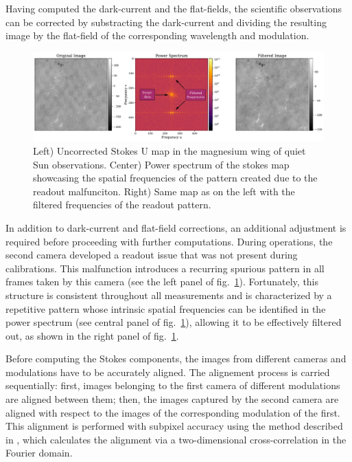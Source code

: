 Having computed the dark-current and the flat-fields, the scientific observations can be corrected by substracting the dark-current and dividing the resulting image by the flat-field of the corresponding wavelength and modulation. 

\begin{figure}
  \includegraphics[width=\textwidth]{figures/Pipeline/readout_problem.pdf}
  \caption[Readout pattern filtering]{Left) Uncorrected Stokes U map in the magnesium wing of quiet Sun observations. Center) Power spectrum of the stokes map showcasing the spatial frequencies of the pattern created due to the readout malfunciton. Right) Same map as on the left with the filtered frequencies of the readout pattern.}
    \label{fig_pipeline: readout}
\end{figure}

In addition to dark-current and flat-field corrections, an additional adjustment is required before proceeding with further computations. During operations, the second camera developed a readout issue that was not present during calibrations. This malfunction introduces a recurring spurious pattern in all frames taken by this camera (see the left panel of fig.~\ref{fig_pipeline: readout}). Fortunately, this structure is consistent throughout all measurements and is characterized by a repetitive pattern whose intrinsic spatial frequencies can be identified in the power spectrum (see central panel of fig.~\ref{fig_pipeline: readout}), allowing it to be effectively filtered out, as shown in the right panel of fig.~\ref{fig_pipeline: readout}.  

Before computing the Stokes components, the images from different cameras and modulations have to be accurately aligned. The alignement process is carried sequentially: first, images belonging to the first camera of different modulations are aligned between them; then, the images captured by the second camera are aligned with respect to the images of the corresponding modulation of the first. This alignment is performed with subpixel accuracy using the method described in \cite{alineamiento}, which calculates the alignment via a two-dimensional cross-correlation in the Fourier domain.

